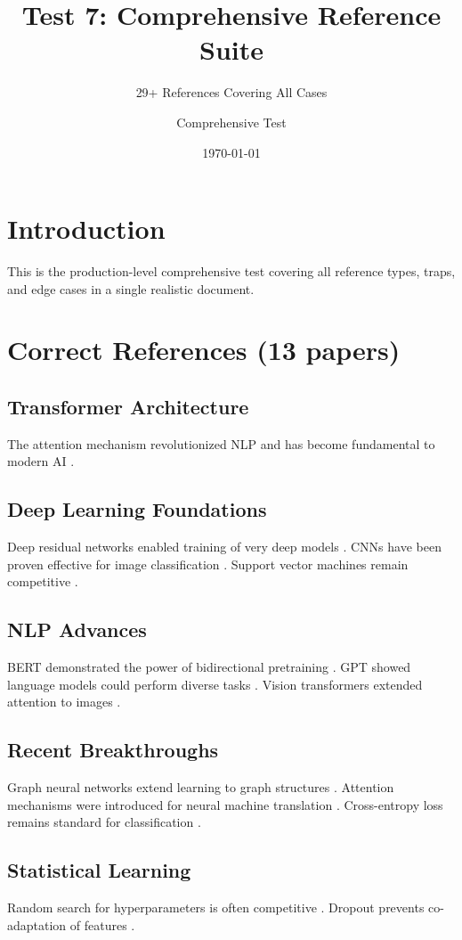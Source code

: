 \documentclass{article}
\title{Test 7: Comprehensive Reference Suite}
\subtitle{29+ References Covering All Cases}
\author{Comprehensive Test}
\date{\today}
\begin{document}
\section{Introduction}

This is the production-level comprehensive test covering all reference types, traps, and edge cases in a single realistic document.

\section{Correct References (13 papers)}

\subsection{Transformer Architecture}
The attention mechanism revolutionized NLP \cite{Vaswani2017} and has become fundamental to modern AI \cite{Dosovitskiy2020}.

\subsection{Deep Learning Foundations}
Deep residual networks enabled training of very deep models \cite{He2015}. CNNs have been proven effective for image classification \cite{LeCun1998}. Support vector machines remain competitive \cite{Cortes1995}.

\subsection{NLP Advances}
BERT demonstrated the power of bidirectional pretraining \cite{Devlin2018}. GPT showed language models could perform diverse tasks \cite{Radford2019}. Vision transformers extended attention to images \cite{Dosovitskiy2020ViT}.

\subsection{Recent Breakthroughs}
Graph neural networks extend learning to graph structures \cite{Hamilton2017}. Attention mechanisms were introduced for neural machine translation \cite{Bahdanau2014}. Cross-entropy loss remains standard for classification \cite{Goodman2002}.

\subsection{Statistical Learning}
Random search for hyperparameters is often competitive \cite{Bergstra2012}. Dropout prevents co-adaptation of features \cite{Hinton2012}.
\end{document}
